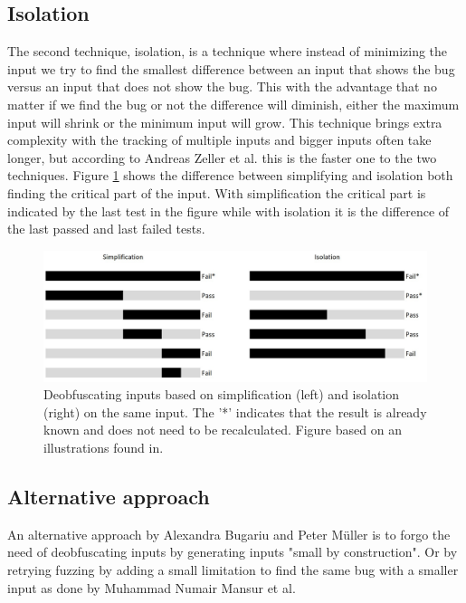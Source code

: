 \subsection{Isolation}
\label{cha:3:Isolation}
The second technique, isolation, is a technique where instead of minimizing the input we try to find the smallest difference between an input that shows the bug versus an input that does not show the bug. This with the advantage that no matter if we find the bug or not the difference will diminish, either the maximum input will shrink or the minimum input will grow. 
This technique brings extra complexity with the tracking of multiple inputs and bigger inputs often take longer, but according to Andreas Zeller et al.\cite{5zeller2002simplifyingIsolatingFailure-inducing} this is the faster one to the two techniques. 
Figure \ref{fig:simplificationIsolation} shows the difference between simplifying and isolation both finding the critical part of the input. With simplification the critical part is indicated by the last test in the figure while with isolation it is the difference of the last passed and last failed tests.
\begin{figure}
	\centering
	\includegraphics[width=1.0\textwidth]{images/simplificationIsolation}
	\caption{Deobfuscating inputs based on simplification (left) and isolation (right) on the same input. The '*' indicates that the result is already known and does not need to be recalculated. Figure based on an illustrations found in\cite{bookZellerwhyProgramsFail}.}
	\label{fig:simplificationIsolation}
\end{figure}

\subsection{Alternative approach}
An alternative approach by Alexandra Bugariu and Peter M\"uller\cite{9bugariu2020automaticallyTestingStringSolvers} is to forgo the need of deobfuscating inputs by generating inputs "small by construction". Or by retrying fuzzing by adding a small limitation to find the same bug with a smaller input as done by Muhammad Numair Mansur et al\cite{1mansur2020detecting}.

